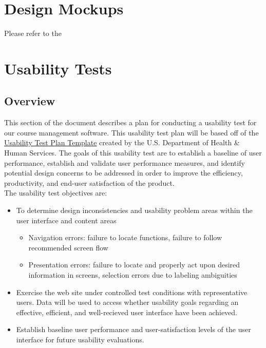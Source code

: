 \documentclass[10pt]{article}
\begin{document}
\begin{multicols}{2}
\section*{Design Mockups}
Please refer to the 

\section*{Usability Tests}
\subsection*{Overview}
This section of the document describes a plan for conducting a usability test for our course management software. This usability test plan will be based off of the \href{http://www.usability.gov/how-to-and-tools/resources/templates/usability-test-plan-template.html}{\underline{Usability Test Plan Template}} created by the U.S. Department of Health \& Human Services. The goals of this usability test are to establish a baseline of user performance, establish and validate user performance measures, and identify potential design concerns to be addressed in order to improve the efficiency, productivity, and end-user satisfaction of the product.\\

The usability test objectives are:
\begin{itemize}
\item To determine design inconsistencies and usability problem areas within the user interface and content areas
	\begin{itemize}
	\item Navigation errors: failure to locate functions, failure to follow recommended screen flow
	\item Presentation errors: failure to locate and properly act upon desired information in screens, selection errors due to labeling ambiguities
	\end{itemize}
	
\item Exercise the web site under controlled test conditions with representative users. Data will be used to access whether usability goals regarding an effective, efficient, and well-recieved user interface have been achieved.

\item Establish baseline user performance and user-satisfaction levels of the user interface for future usability evaluations.
\end{itemize}


\end{multicols}
\end{document}
